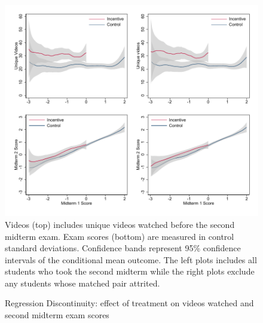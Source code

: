 \documentclass[12pt]{article}
\begin{document}
\clearpage
\begin{figure}[t]
\begin{center}
\caption{Regression Discontinuity: effect of treatment on videos watched and second midterm exam scores}
\label{rdmid2}
\includegraphics[width=1\textwidth, angle=0]{../plots/lpolymid2.pdf}
\footnotesize Videos (top) includes unique videos watched before the second midterm exam. Exam scores (bottom) are measured in control standard deviations. Confidence bands represent 95\% confidence intervals of the conditional mean outcome. The left plots includes all students who took the second midterm while the right plots exclude any students whose matched pair attrited.
\end{center}
\end{figure}
\end{document}
